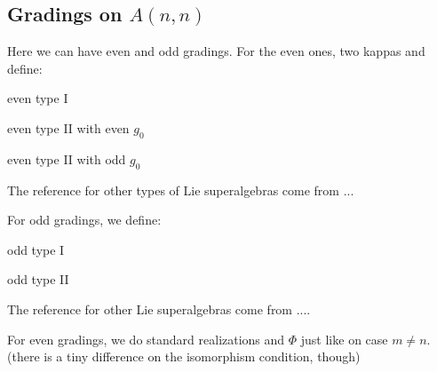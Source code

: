 


\subsection{Gradings on \texorpdfstring{$A(n,n)$}{A(n,n)}}

Here we can have even and odd gradings. 
For the even ones, two kappas and define:

\begin{defi}
    \mbox{}
    
    
        even type I
        
    
        even type II with even $g_0$
        
    
        even type II with odd $g_0$
\end{defi}

The reference for other types of Lie superalgebras come from ...

For odd gradings, we define: 

\begin{defi}
    \mbox{}
    
    
        odd type I
        
    
        odd type II
\end{defi}

The reference for other Lie superalgebras come from ....

For even gradings, we do standard realizations and $\Phi$ just like on case $m \neq n$. 
(there is a tiny difference on the isomorphism condition, though)

